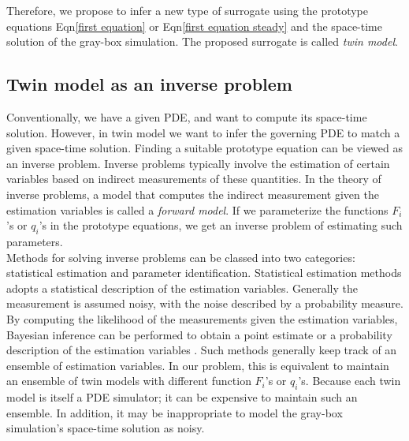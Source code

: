 \documentclass[a4paper,onecolumn]{article}
\theoremstyle{remark}
\begin{document}
\noindent Therefore, we propose to infer a new type of surrogate using 
the prototype equations Eqn\eqref{first equation} or
Eqn\eqref{first equation steady} and the space-time solution of the gray-box simulation.
The proposed surrogate is called \emph{twin model}.



\subsection{Twin model as an inverse problem}
\label{inverse}
\noindent 
Conventionally, we have a given PDE, and want to compute
its space-time solution. However, in twin model we want to infer the governing PDE
to match a given space-time solution.
Finding a suitable prototype equation can be viewed
as an inverse problem. Inverse problems typically involve the estimation of certain variables
based on indirect measurements of these quantities. In the theory of inverse problems,
a model that computes the indirect
measurement given the estimation variables is called a \emph{forward model}.
If we parameterize the functions $F_i$'s or $q_i$'s in the prototype equations,
we get an inverse problem of estimating such parameters.
\\

\noindent Methods for solving inverse problems can be classed into two categories:
statistical estimation and parameter identification. 
Statistical estimation methods
adopts a statistical description of the estimation variables. Generally
the measurement is assumed noisy, with the noise described by a probability measure.
By computing the likelihood of the measurements given the estimation variables,
Bayesian inference can be performed to obtain a point estimate or a probability description
of the estimation variables \cite{inverse book}. Such methods generally keep track of an ensemble of 
estimation variables. In our problem, this is equivalent to maintain an ensemble of
twin models with different function $F_i$'s or $q_i$'s.
Because each twin model is itself
a PDE simulator; it can be expensive to maintain such an ensemble. 
In addition, it may be inappropriate to model the gray-box simulation's space-time solution as noisy.\\
\end{document}
